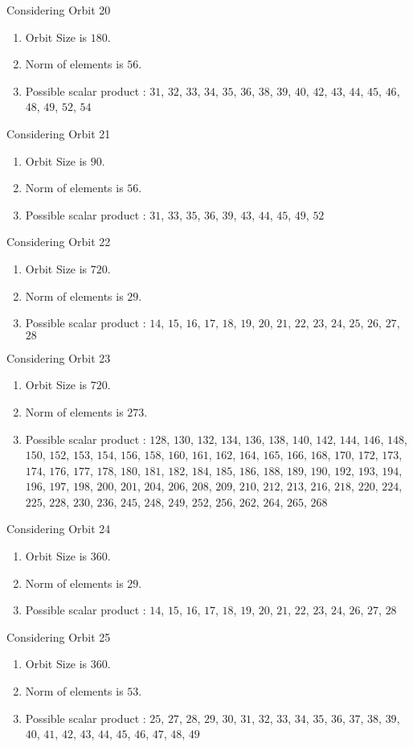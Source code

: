 \documentclass[12pt]{article}
\begin{document}
Considering Orbit 20
\begin{enumerate}
\item Orbit Size is $180$.
\item Norm of elements is $56$.
\item Possible scalar product : $31$, $32$, $33$, $34$, $35$, $36$, $38$, $39$, $40$, $42$, $43$, $44$, $45$, $46$, $48$, $49$, $52$, $54$
\end{enumerate}
Considering Orbit 21
\begin{enumerate}
\item Orbit Size is $90$.
\item Norm of elements is $56$.
\item Possible scalar product : $31$, $33$, $35$, $36$, $39$, $43$, $44$, $45$, $49$, $52$
\end{enumerate}
Considering Orbit 22
\begin{enumerate}
\item Orbit Size is $720$.
\item Norm of elements is $29$.
\item Possible scalar product : $14$, $15$, $16$, $17$, $18$, $19$, $20$, $21$, $22$, $23$, $24$, $25$, $26$, $27$, $28$
\end{enumerate}
Considering Orbit 23
\begin{enumerate}
\item Orbit Size is $720$.
\item Norm of elements is $273$.
\item Possible scalar product : $128$, $130$, $132$, $134$, $136$, $138$, $140$, $142$, $144$, $146$, $148$, $150$, $152$, $153$, $154$, $156$, $158$, $160$, $161$, $162$, $164$, $165$, $166$, $168$, $170$, $172$, $173$, $174$, $176$, $177$, $178$, $180$, $181$, $182$, $184$, $185$, $186$, $188$, $189$, $190$, $192$, $193$, $194$, $196$, $197$, $198$, $200$, $201$, $204$, $206$, $208$, $209$, $210$, $212$, $213$, $216$, $218$, $220$, $224$, $225$, $228$, $230$, $236$, $245$, $248$, $249$, $252$, $256$, $262$, $264$, $265$, $268$
\end{enumerate}
Considering Orbit 24
\begin{enumerate}
\item Orbit Size is $360$.
\item Norm of elements is $29$.
\item Possible scalar product : $14$, $15$, $16$, $17$, $18$, $19$, $20$, $21$, $22$, $23$, $24$, $26$, $27$, $28$
\end{enumerate}
Considering Orbit 25
\begin{enumerate}
\item Orbit Size is $360$.
\item Norm of elements is $53$.
\item Possible scalar product : $25$, $27$, $28$, $29$, $30$, $31$, $32$, $33$, $34$, $35$, $36$, $37$, $38$, $39$, $40$, $41$, $42$, $43$, $44$, $45$, $46$, $47$, $48$, $49$
\end{enumerate}
\end{document}
